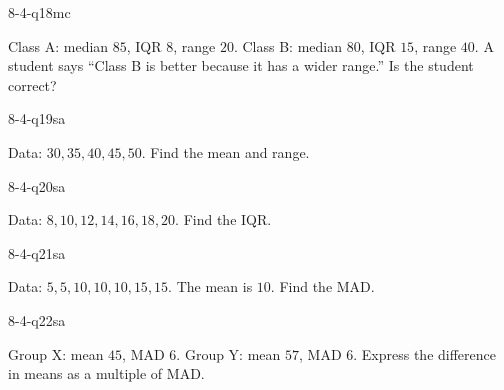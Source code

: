 \begin{practiceQuestion}{8-4-q18}{mc}
\begin{questionText}
Class A: median $85$, IQR $8$, range $20$. Class B: median $80$, IQR $15$, range $40$. A student says ``Class B is better because it has a wider range.'' Is the student correct?
\end{questionText}
\end{practiceQuestion}


\begin{practiceQuestion}{8-4-q19}{sa}
\begin{questionText}
Data: $30, 35, 40, 45, 50$. Find the mean and range.
\end{questionText}
\end{practiceQuestion}

\begin{practiceQuestion}{8-4-q20}{sa}
\begin{questionText}
Data: $8, 10, 12, 14, 16, 18, 20$. Find the IQR.
\end{questionText}
\end{practiceQuestion}

\begin{practiceQuestion}{8-4-q21}{sa}
\begin{questionText}
Data: $5, 5, 10, 10, 10, 15, 15$. The mean is $10$. Find the MAD.
\end{questionText}
\end{practiceQuestion}

\begin{practiceQuestion}{8-4-q22}{sa}
\begin{questionText}
Group X: mean $45$, MAD $6$. Group Y: mean $57$, MAD $6$. Express the difference in means as a multiple of MAD.
\end{questionText}
\end{practiceQuestion}

